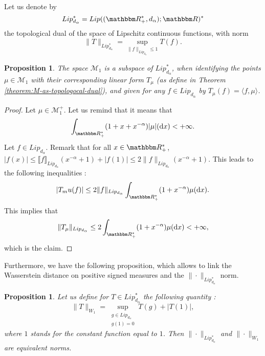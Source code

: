 \documentclass[a4paper,11pt, reqno]{amsart}
\newcommand{\cM}{\mathcal{M}}	\newcommand{\MM}{\mathbbm{M}}
\newcommand{\dd}{\mathop{}\!\mathrm{d}}
\newcommand{\1}{\mathbbm{1}}
\theoremstyle{plain}
\newtheorem{proposition}[theorem]{Proposition}
\theoremstyle{definition}
\begin{document}
Let us denote by 
\[Lip^*_{d_\alpha} = Lip((\RR_+^*,d_\alpha);\RR)^*\]
the topological dual of the space of Lipschitz continuous functions, with  norm
\[ \|T\|_{Lip^*_{d_\alpha}} = \sup_{\|f\|_{Lip_{d_\alpha}}\le 1} T(f). \]

\begin{proposition}\label{proposition:dual}
The space $\cM_1$ is a subspace of $Lip_{d_\alpha}^*$, when identifying the points $\mu \in \cM_1$ with their corresponding linear form $T_\mu$ (as define in Theorem \ref{theorem:M-as-topologocal-dual}), and given for any $f\in Lip_{d_\alpha}$ by $T_\mu(f) = \langle f,\mu \rangle$.
\end{proposition}

\begin{proof}
    Let $\mu \in \cM_1^+$. Let us remind that it means that  
    \[\int_{\RR_+^* } (1 + x + x^{-\alpha}) |\mu|(\dd x) < + \infty.\]
    Let $f\in Lip_{d_\alpha}$. Remark that for all $x\in \RR_+^*$, $|f(x)| \le \llbracket f \rrbracket_{Lip_{d_\alpha}} (x^{-\alpha} + 1) + |f(1)|\le 2 \|f\|_{Lip_{d_\alpha}}(x^{-\alpha} + 1)$. This leads to the following inequalities :
    \[|T_mu(f)| \le 2\|f\|_{Lip_{d_\alpha}} \int_{\RR_+^*}( 1 + x^{-\alpha} )\mu(\dd x).\]
    This implies that 
    \[\|T_\mu\|_{Lip_{d_\alpha}} \le 2 \int_{\RR_+^*}( 1+x^{-\alpha})\mu(\dd x)<+\infty,\]
    which is the claim.
\end{proof}

Furthermore, we have the following proposition, which allows to link the Wasserstein distance on positive signed measures and the $\|\cdot\|_{Lip_{d_\alpha}^*}$ norm.

\begin{proposition}
    Let us define for $T\in Lip_{d_\alpha}^*$ the following quantity :
    \[\|T\|_{W_1} = \sup_{\substack{g\in Lip_{d_\alpha}\\g(1)=0}} T(g) + |T(1)|,\]
    where $1$ stands for the constant function equal to $1$. Then $\|\cdot\|_{Lip_{d_\alpha}^*}$ and $\|\cdot\|_{W_1}$ are equivalent norms. 
\end{proposition}
\end{document}
